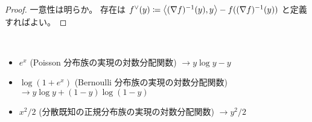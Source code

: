 \documentclass[report]{jlreq}
\begin{document}
\begin{proof}
    一意性は明らか。
    存在は
    $f^\vee(y)
        \coloneqq
            \left\langle{(\nabla f)^{-1}(y)},{y}\right\rangle - f((\nabla f)^{-1}(y))$
    と定義すればよい。
\end{proof}

\begin{example}
    ~
    \begin{itemize}
        \item $e^x$ (Poisson 分布族の実現の対数分配関数)
            $\to y \log y - y$
        \item $\log (1 + e^x)$ (Bernoulli 分布族の実現の対数分配関数)
            $\to y \log y + (1 - y) \log (1 - y)$
        \item $x^2 / 2$ (分散既知の正規分布族の実現の対数分配関数)
            $\to y^2 / 2$
    \end{itemize}
\end{example}

\end{document}
